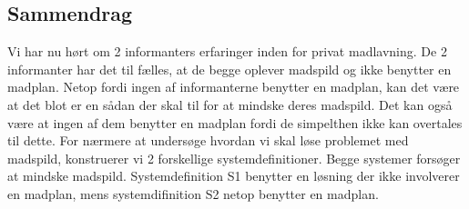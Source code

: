 \subsection{Sammendrag}
Vi har nu hørt om 2 informanters erfaringer inden for privat madlavning. De 2 informanter har det til fælles, at de begge oplever madspild og ikke benytter en madplan. Netop fordi ingen af informanterne benytter en madplan, kan det være at det blot er en sådan der skal til for at mindske deres madspild. Det kan også være at ingen af dem benytter en madplan fordi de simpelthen ikke kan overtales til dette. For nærmere at undersøge hvordan vi skal løse problemet med madspild, konstruerer vi 2 forskellige systemdefinitioner. Begge systemer forsøger at mindske madspild. Systemdefinition S1 benytter en løsning der ikke involverer en madplan, mens systemdifinition S2 netop benytter en madplan.